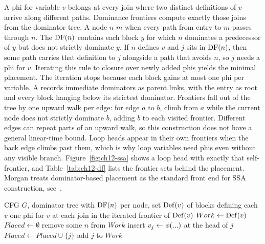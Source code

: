 A phi for variable $v$ belongs at every join where two distinct definitions of $v$ arrive along different paths.
Dominance frontiers compute exactly those joins from the dominator tree.
A node $n$  $m$ when every path from entry to $m$ passes through $n$.
The  $\operatorname{DF}(n)$ contains each block $y$ for which $n$ dominates a predecessor of $y$ but does not strictly dominate $y$.
If $n$ defines $v$ and $j$ sits in $\operatorname{DF}(n)$, then some path carries that definition to $j$ alongside a path that avoids $n$, so $j$ needs a phi for $v$.
Iterating this rule to closure over newly added phis yields the minimal placement.
The iteration stops because each block gains at most one phi per variable.
A  records immediate dominators as parent links, with the entry as root and every block hanging below its strictest dominator.
Frontiers fall out of the tree by one upward walk per edge: for edge $a$ to $b$, climb from $a$ while the current node does not strictly dominate $b$, adding $b$ to each visited frontier.
Different edges can repeat parts of an upward walk, so this construction does not have a general linear-time bound.
Loop heads appear in their own frontiers when the back edge climbs past them, which is why loop variables need phis even without any visible branch.
Figure~\ref{fig:ch12-ssa} shows a loop head with exactly that self-frontier, and Table~\ref{tab:ch12-df} lists the frontier sets behind the placement.
Morgan treats dominator-based placement as the standard front end for SSA construction, see~\cite{morgan-1998-optimizing}.

\begin{algorithm}
\caption{Minimal phi placement by iterated dominance frontiers}\label{alg:ch12-placement}
\begin{pseudocode}
\Require CFG $G$, dominator tree with $\operatorname{DF}(n)$ per node, set $\operatorname{Def}(v)$ of blocks defining each $v$
\Ensure one phi for $v$ at each join in the iterated frontier of $\operatorname{Def}(v)$
\State $Work \gets \operatorname{Def}(v)$
\State $Placed \gets \emptyset$
\State remove some $n$ from $Work$
\State insert $v_j \gets \phi(...)$ at the head of $j$
\State $Placed \gets Placed \cup \{j\}$
\State add $j$ to $Work$
\EndIf
\EndIf
\EndFor
\EndWhile
\EndFor
\end{pseudocode}
\end{algorithm}

